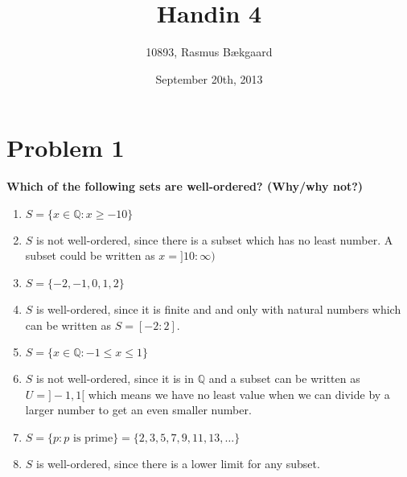 \documentclass[english,11pt,a4paper]{article}
\title{Handin 4}
\author{10893, Rasmus Bækgaard}
\date{September 20th, 2013}
\begin{document}
\maketitle

\section*{Problem 1}
\textbf{Which of the  following sets are well-ordered? (Why/why not?)}
\begin{enumerate}[a]
\item $S=\{x \in \mathbb{Q}: x\geq -10\}$
\item[] $S$ is not well-ordered, since there is a subset which has no least number. A subset could be written as  $x=]10:\infty)$ 

\item $S=\{-2 ,-1, 0, 1, 2\}$
\item[] $S$ is well-ordered, since it is finite and and only with natural numbers which can be written as $S=[-2:2]$.


\item $S=\{x \in \mathbb{Q}: -1\leq x \leq 1\}$
\item[] $S$ is not well-ordered, since it is in $\mathbb{Q}$ and a subset can be written as $U=]-1,1[$ which means we have no least value when we can divide by a larger number to get an even smaller number.


\item $S=\{p :p \text{ is prime}\} = \{2, 3,5,7,9,11,13,\dots\}$
\item[] $S$ is well-ordered, since there is a lower limit for any subset.
\end{enumerate}
\end{document}
